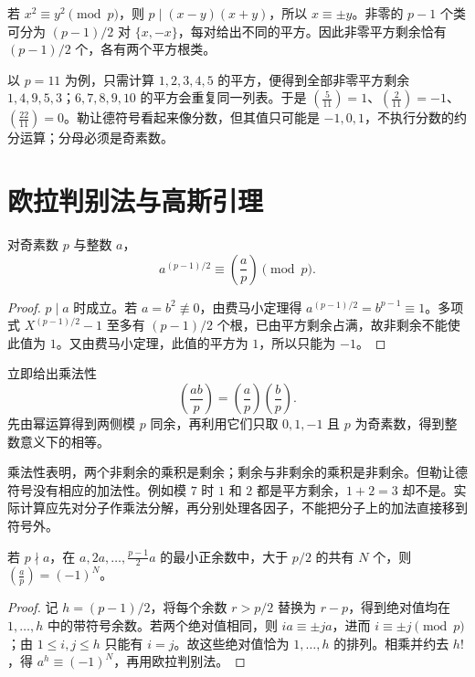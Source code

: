 \documentclass[UTF8,12pt,a4paper,fontset=fandol]{ctexbook}
\begin{document}
若 $x^2\equiv y^2\pmod p$，则 $p\mid(x-y)(x+y)$，所以 $x\equiv\pm y$。非零的 $p-1$ 个类可分为 $(p-1)/2$ 对 $\{x,-x\}$，每对给出不同的平方。因此非零平方剩余恰有 $(p-1)/2$ 个，各有两个平方根类。

以 $p=11$ 为例，只需计算 $1,2,3,4,5$ 的平方，便得到全部非零平方剩余 $1,4,9,5,3$；$6,7,8,9,10$ 的平方会重复同一列表。于是 $\left(\frac5{11}\right)=1$、$\left(\frac2{11}\right)=-1$、$\left(\frac{22}{11}\right)=0$。勒让德符号看起来像分数，但其值只可能是 $-1,0,1$，不执行分数的约分运算；分母必须是奇素数。

\section{欧拉判别法与高斯引理}

\begin{theorem}[欧拉判别法]
\label{thm:euler-criterion}
对奇素数 $p$ 与整数 $a$，
\begin{equation}
 a^{(p-1)/2}\equiv\left(\frac ap\right)\pmod p.
 \label{eq:euler-criterion}
\end{equation}
\end{theorem}
\begin{proof}
$p\mid a$ 时成立。若 $a=b^2\not\equiv0$，由费马小定理得 $a^{(p-1)/2}=b^{p-1}\equiv1$。多项式 $X^{(p-1)/2}-1$ 至多有 $(p-1)/2$ 个根，已由平方剩余占满，故非剩余不能使此值为 $1$。又由费马小定理，此值的平方为 $1$，所以只能为 $-1$。
\end{proof}

立即给出乘法性
\[
 \left(\frac{ab}{p}\right)=\left(\frac ap\right)\left(\frac bp\right).
\]
先由幂运算得到两侧模 $p$ 同余，再利用它们只取 $0,1,-1$ 且 $p$ 为奇素数，得到整数意义下的相等。

乘法性表明，两个非剩余的乘积是剩余；剩余与非剩余的乘积是非剩余。但勒让德符号没有相应的加法性。例如模 $7$ 时 $1$ 和 $2$ 都是平方剩余，$1+2=3$ 却不是。实际计算应先对分子作乘法分解，再分别处理各因子，不能把分子上的加法直接移到符号外。

\begin{lemma}
\label{lem:gauss}
若 $p\nmid a$，在 $a,2a,\ldots,\frac{p-1}{2}a$ 的最小正余数中，大于 $p/2$ 的共有 $N$ 个，则 $\left(\frac ap\right)=(-1)^N$。
\end{lemma}
\begin{proof}
记 $h=(p-1)/2$，将每个余数 $r>p/2$ 替换为 $r-p$，得到绝对值均在 $1,\ldots,h$ 中的带符号余数。若两个绝对值相同，则 $ia\equiv\pm ja$，进而 $i\equiv\pm j\pmod p$；由 $1\le i,j\le h$ 只能有 $i=j$。故这些绝对值恰为 $1,\ldots,h$ 的排列。相乘并约去 $h!$，得 $a^h\equiv(-1)^N$，再用欧拉判别法。
\end{proof}
\end{document}

